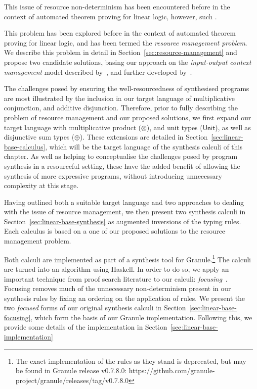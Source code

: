 This issue of resource non-determinism has been encountered before in the
context of automated theorem proving for linear logic, however, such . 
 
This problem has been explored before in the context of automated theorem
proving for linear logic, and has been termed the \textit{resource management
problem}. We describe this problem in detail in
Section~\ref{sec:resource-management} and propose two candidate solutions,
basing our approach on the \textit{input-output context management} model
described by~\citet{HODAS1994327}, and further developed
by~\citet{CERVESATO2000133}. 

The challenges posed by ensuring the well-resourcedness of synthesised programs
are most illustrated by the inclusion in our target language of multiplicative
conjunction, and additive disjunction. Therefore, prior to fully describing the
problem of resource management and our proposed solutions, we first expand our
target language with multiplicative product ($\otimes$), and unit types
($\mathsf{Unit}$), as well as disjunctive sum types ($\oplus$). These extensions
are detailed in Section~\ref{sec:linear-base-calculus}, which will be the target
language of the synthesis calculi of this chapter. As well as helping to
conceptualise the challenges posed by program synthesis in a resourceful
setting, these have the added benefit of allowing the synthesis of more
expressive programs, without introducing unnecessary complexity at this stage.

Having outlined both a suitable target language and two approaches to dealing
with the issue of resource management, we then present two synthesis calculi in
Section~\ref{sec:linear-base-synthesis} as augmented inversions of the typing
rules. Each calculus is based on a one of our proposed solutions to the resource
management problem.  

Both calculi are implemented as part of a synthesis tool for
Granule.\footnote{The exact implementation of the rules as they stand is
deprecated, but may be found in Granule release v0.7.8.0:
https://github.com/granule-project/granule/releases/tag/v0.7.8.0} The calculi
are turned into an algorithm using Haskell. In order to do so, we apply an
important technique from proof search literature to our calculi:
\emph{focusing}~\citep{focusing}. Focusing removes much of the unnecessary
non-determinism present in our synthesis rules by fixing an ordering on the
application of rules. We present the two \textit{focused} forms of our original
synthesis calculi in Section~\ref{sec:linear-base-focusing}, which form the
basis of our Granule implementation. Following this, we provide some details of
the implementation in Section~\ref{sec:linear-base-implementation}

